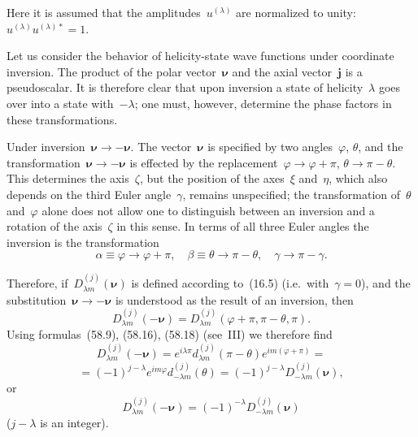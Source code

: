 Here it is assumed that the amplitudes~$u^{(\lambda)}$ are normalized to unity: $u^{(\lambda)}u^{(\lambda)*} = 1$.

Let us consider the behavior of helicity-state wave functions under coordinate inversion. The product of the polar vector~$\boldsymbol{\nu}$ and the axial vector~$\mathbf{j}$ is a pseudoscalar. It is therefore clear that upon inversion a state of helicity~$\lambda$ goes over into a state with~$-\lambda$; one must, however, determine the phase factors in these transformations.

Under inversion~$\boldsymbol{\nu} \to -\boldsymbol{\nu}$. The vector~$\boldsymbol{\nu}$ is specified by two angles~$\varphi$, $\theta$, and the transformation~$\boldsymbol{\nu} \to -\boldsymbol{\nu}$ is effected by the replacement~$\varphi \to \varphi + \pi$, $\theta \to \pi - \theta$. This determines the axis~$\zeta$, but the position of the axes~$\xi$ and~$\eta$, which also depends on the third Euler angle~$\gamma$, remains unspecified; the transformation of~$\theta$ and~$\varphi$ alone does not allow one to distinguish between an inversion and a rotation of the axis~$\zeta$ in this sense. In terms of all three Euler angles the inversion is the transformation
\begin{equation}
\alpha \equiv \varphi \to \varphi + \pi, \quad \beta \equiv \theta \to \pi - \theta, \quad \gamma \to \pi - \gamma.
\tag{16.8}
\end{equation}

Therefore, if~$D^{(j)}_{\lambda m}(\boldsymbol{\nu})$ is defined according to~(16.5) (i.e.\ with~$\gamma = 0$), and the substitution~$\boldsymbol{\nu} \to -\boldsymbol{\nu}$ is understood as the result of an inversion, then
\begin{equation}
D^{(j)}_{\lambda m}(-\boldsymbol{\nu}) = D^{(j)}_{\lambda m}(\varphi + \pi, \pi - \theta, \pi).
\tag{16.9}
\end{equation}
Using formulas~(58.9), (58.16), (58.18) (see~III) we therefore find
\[
D^{(j)}_{\lambda m}(-\boldsymbol{\nu}) = e^{i\lambda\pi}d^{(j)}_{\lambda m}(\pi - \theta)e^{im(\varphi + \pi)} =
\]
\[
= (-1)^{j-\lambda}e^{im\varphi}d^{(j)}_{-\lambda m}(\theta) = (-1)^{j-\lambda}D^{(j)}_{-\lambda m}(\boldsymbol{\nu}),
\]
or
\begin{equation}
D^{(j)}_{\lambda m}(-\boldsymbol{\nu}) = (-1)^{-\lambda}D^{(j)}_{-\lambda m}(\boldsymbol{\nu})
\tag{16.10}
\end{equation}
($j - \lambda$ is an integer).

